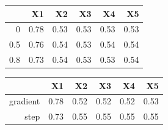 \documentclass[authoryear, review, 11pt]{elsarticle}
\begin{document}
\begin{table}[ht]
\begin{center}
\begin{tabular}{rrrrrr}
  \hline
 & X1 & X2 & X3 & X4 & X5 \\ 
  \hline
0 & 0.78 & 0.53 & 0.53 & 0.53 & 0.53 \\ 
  0.5 & 0.76 & 0.54 & 0.53 & 0.54 & 0.54 \\ 
  0.8 & 0.73 & 0.54 & 0.53 & 0.53 & 0.54 \\ 
   \hline
\end{tabular}
\end{center}
\end{table}


\begin{table}[ht]
\begin{center}
\begin{tabular}{rrrrrr}
  \hline
 & X1 & X2 & X3 & X4 & X5 \\ 
  \hline
gradient & 0.78 & 0.52 & 0.52 & 0.52 & 0.53 \\ 
  step & 0.73 & 0.55 & 0.55 & 0.55 & 0.55 \\ 
   \hline
\end{tabular}
\end{center}
\end{table}
		
\end{document}
